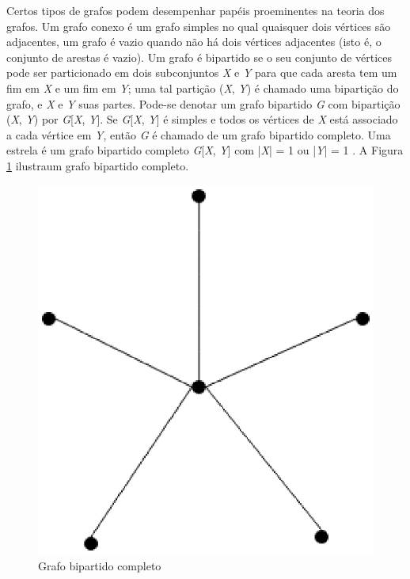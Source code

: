 Certos tipos de grafos podem desempenhar papéis proeminentes na teoria dos grafos. Um grafo conexo é um grafo simples no qual quaisquer dois vértices são adjacentes, um grafo é vazio quando não há dois vértices adjacentes (isto é, o conjunto de arestas é vazio). Um grafo é bipartido se o seu conjunto de vértices pode ser particionado em dois subconjuntos \textit{X} e \textit{Y} para que cada aresta tem um fim em \textit{X} e um fim em \textit{Y}; uma tal partição (\textit{X}, \textit{Y}) é chamado uma bipartição do grafo, e \textit{X} e \textit{Y} suas partes. Pode-se denotar um grafo bipartido \textit{G} com bipartição (\textit{X}, \textit{Y}) por \textit{G}[\textit{X}, \textit{Y}]. Se \textit{G}[\textit{X}, \textit{Y}] é simples e todos os vértices de \textit{X} está associado a cada vértice em \textit{Y}, então \textit{G} é chamado de um grafo bipartido completo. Uma estrela é um grafo bipartido completo \textit{G}[\textit{X}, \textit{Y}] com |\textit{X}| = 1 ou |\textit{Y}| = 1 \cite{Diestel:1997}.  A Figura \ref{bipartido_completo} ilustraum grafo bipartido completo.

\begin{figure}[!h]
	\centering
	\includegraphics[scale=0.5]{figuras/capitulo1/bipartido_completo.eps}
	\caption{Grafo bipartido completo}
	\label{bipartido_completo}
\end{figure}

